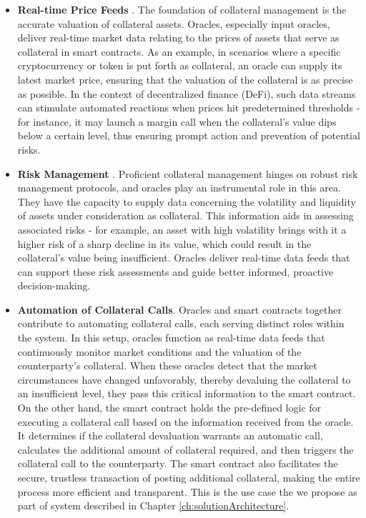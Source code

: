 \begin{itemize}
    \item \textbf{Real-time Price Feeds} \citep{Decentralized_Data_Feeds}. The foundation of collateral management is the accurate valuation of collateral assets. Oracles, especially input oracles, deliver real-time market data relating to the prices of assets that serve as collateral in smart contracts. As an example, in scenarios where a specific cryptocurrency or token is put forth as collateral, an oracle can supply its latest market price, ensuring that the valuation of the collateral is as precise as possible. In the context of decentralized finance (DeFi), such data streams can stimulate automated reactions when prices hit predetermined thresholds - for instance, it may launch a margin call when the collateral's value dips below a certain level, thus ensuring prompt action and prevention of potential risks.

    \item \textbf{Risk Management} \citep{volatility_oracles}. Proficient collateral management hinges on robust risk management protocols, and oracles play an instrumental role in this area. They have the capacity to supply data concerning the volatility and liquidity of assets under consideration as collateral. This information aids in assessing associated risks - for example, an asset with high volatility brings with it a higher risk of a sharp decline in its value, which could result in the collateral's value being insufficient. Oracles deliver real-time data feeds that can support these risk assessments and guide better informed, proactive decision-making.
    
    \item \textbf{Automation of Collateral Calls}. Oracles and smart contracts together contribute to automating collateral calls, each serving distinct roles within the system. In this setup, oracles function as real-time data feeds that continuously monitor market conditions and the valuation of the counterparty's collateral. When these oracles detect that the market circumstances have changed unfavorably, thereby devaluing the collateral to an insufficient level, they pass this critical information to the smart contract. On the other hand, the smart contract holds the pre-defined logic for executing a collateral call based on the information received from the oracle. It determines if the collateral devaluation warrants an automatic call, calculates the additional amount of collateral required, and then triggers the collateral call to the counterparty. The smart contract also facilitates the secure, trustless transaction of posting additional collateral, making the entire process more efficient and transparent. This is the use case the we propose as part of system described in Chapter \ref{ch:solutionArchitecture}.


\end{itemize}
